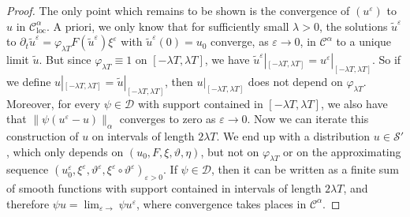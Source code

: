 \documentclass[11pt,a4paper]{article}
\newcommand{\tmop}[1]{\ensuremath{\operatorname{#1}}}
\theoremstyle{remark}
\newcommand{\CC}{\ensuremath{\mathscr{C}}}
\newcommand{\CD}{\ensuremath{\mathscr{D}}}
\newcommand{\CS}{\ensuremath{\mathscr{S}}}
\begin{document}
\begin{proof}
  The only point which remains to be shown is the convergence of $(u^{\varepsilon} )$ to $u$ in $\CC^{\alpha}_{\tmop{loc}}$. A priori,
  we only know that for sufficiently small $\lambda >0$, the solutions
  $\tilde{u}^{\varepsilon}$ to $\partial_{t} \tilde{u}^{\varepsilon} = \varphi_{\lambda T} F ( \tilde{u}^{\varepsilon} ) \xi^{\varepsilon}$ with
  $\tilde{u}^{\varepsilon} ( 0 ) =u_{0}$ converge, as $\varepsilon \rightarrow 0$, in $  \CC^{\alpha}$ to a unique limit $\tilde{u}$.
  But since $\varphi_{\lambda T} \equiv 1$ on $[ - \lambda T, \lambda T ]$, we
  have $\tilde{u}^{\varepsilon} |_{[ - \lambda T, \lambda T ]} =u^{\varepsilon} |_{[ - \lambda T, \lambda T ]}$. So if we define $u|_{[ -  \lambda T, \lambda T ]} = \tilde{u} |_{[ - \lambda T, \lambda T ]}$, then
  $u|_{[ - \lambda T, \lambda T ]}$ does not depend on $\varphi_{\lambda T}$.
  Moreover, for every $\psi \in \CD$ with support contained in $[ - \lambda T, \lambda T ]$, we also have that $\| \psi ( u^{\varepsilon} -u ) \|_{\alpha}$ converges to zero as $\varepsilon \rightarrow 0$. Now we can
  iterate this construction of $u$ on intervals of length $2 \lambda T$. We
  end up with a distribution $u \in \CS'$, which only depends
  on $( u_{0} ,F, \xi , \vartheta , \eta )$, but not on $\varphi_{\lambda T}$
  or on the approximating sequence $(u_0^\varepsilon, \xi^{\varepsilon} , \vartheta^{\varepsilon} , \xi^{\varepsilon} \circ \vartheta^{\varepsilon} )_{\varepsilon >0}$. If $\psi \in \CD$, then it can be written as a
  finite sum of smooth functions with support contained in intervals of length
  $2 \lambda T$, and therefore $\psi u= \lim_{\varepsilon \rightarrow} \psi u^{\varepsilon}$, where convergence takes places in $\CC^{\alpha}$.
\end{proof}
\end{document}
